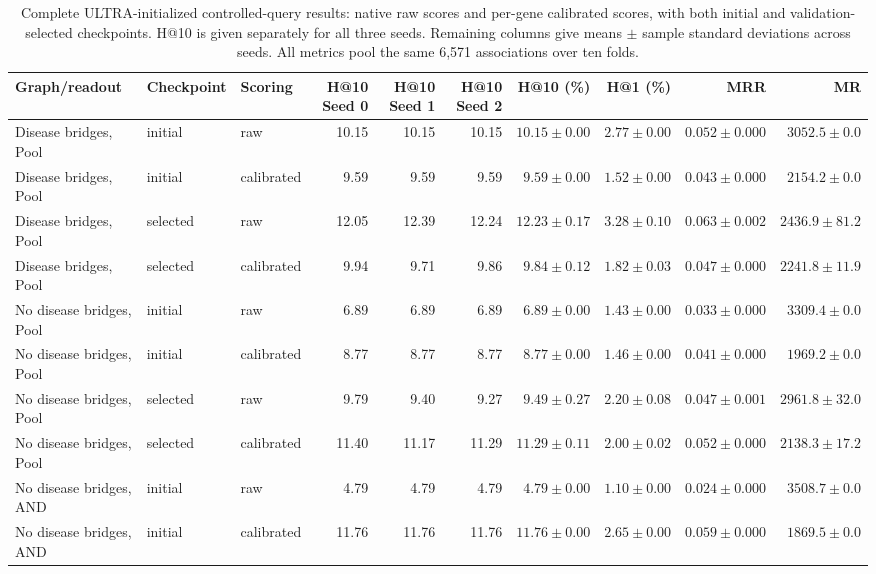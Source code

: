 \begin{landscape}
\begin{table}[p]
\centering\footnotesize
\setlength{\tabcolsep}{3pt}
\caption{Complete ULTRA-initialized controlled-query results: native raw scores and per-gene calibrated scores, with both initial and validation-selected checkpoints. H@10 is given separately for all three seeds. Remaining columns give means $\pm$ sample standard deviations across seeds. All metrics pool the same 6,571 associations over ten folds.}
\label{tab:controlled_query_full_ultra_4g}
\begin{adjustbox}{max width=\linewidth}
\begin{tabular}{lllrrrrrrr}
\toprule
Graph/readout & Checkpoint & Scoring & H@10 Seed 0 & H@10 Seed 1 & H@10 Seed 2 & H@10 (\%) & H@1 (\%) & MRR & MR \\
\midrule
Disease bridges, Pool & initial & raw & 10.15 & 10.15 & 10.15 & $10.15\pm 0.00$ & $2.77\pm 0.00$ & $0.052\pm 0.000$ & $3052.5\pm 0.0$ \\
Disease bridges, Pool & initial & calibrated & 9.59 & 9.59 & 9.59 & $9.59\pm 0.00$ & $1.52\pm 0.00$ & $0.043\pm 0.000$ & $2154.2\pm 0.0$ \\
Disease bridges, Pool & selected & raw & 12.05 & 12.39 & 12.24 & $12.23\pm 0.17$ & $3.28\pm 0.10$ & $0.063\pm 0.002$ & $2436.9\pm 81.2$ \\
Disease bridges, Pool & selected & calibrated & 9.94 & 9.71 & 9.86 & $9.84\pm 0.12$ & $1.82\pm 0.03$ & $0.047\pm 0.000$ & $2241.8\pm 11.9$ \\
No disease bridges, Pool & initial & raw & 6.89 & 6.89 & 6.89 & $6.89\pm 0.00$ & $1.43\pm 0.00$ & $0.033\pm 0.000$ & $3309.4\pm 0.0$ \\
No disease bridges, Pool & initial & calibrated & 8.77 & 8.77 & 8.77 & $8.77\pm 0.00$ & $1.46\pm 0.00$ & $0.041\pm 0.000$ & $1969.2\pm 0.0$ \\
No disease bridges, Pool & selected & raw & 9.79 & 9.40 & 9.27 & $9.49\pm 0.27$ & $2.20\pm 0.08$ & $0.047\pm 0.001$ & $2961.8\pm 32.0$ \\
No disease bridges, Pool & selected & calibrated & 11.40 & 11.17 & 11.29 & $11.29\pm 0.11$ & $2.00\pm 0.02$ & $0.052\pm 0.000$ & $2138.3\pm 17.2$ \\
No disease bridges, AND & initial & raw & 4.79 & 4.79 & 4.79 & $4.79\pm 0.00$ & $1.10\pm 0.00$ & $0.024\pm 0.000$ & $3508.7\pm 0.0$ \\
No disease bridges, AND & initial & calibrated & 11.76 & 11.76 & 11.76 & $11.76\pm 0.00$ & $2.65\pm 0.00$ & $0.059\pm 0.000$ & $1869.5\pm 0.0$ \\

\end{tabular}
\end{adjustbox}
\end{table}
\end{landscape}
